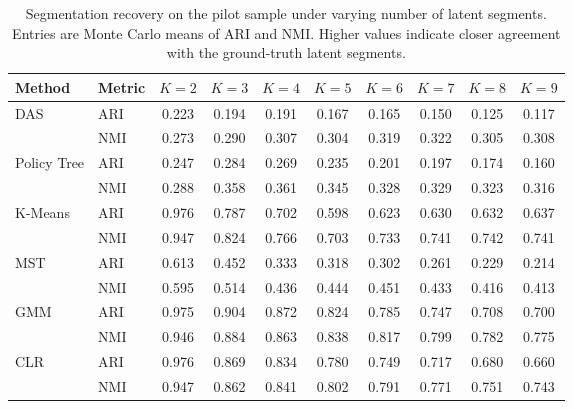 \begin{table}[htbp]
\centering
\caption{Segmentation recovery on the pilot sample under varying number of latent segments. Entries are Monte Carlo means of ARI and NMI. Higher values indicate closer agreement with the ground-truth latent segments.}
\label{tab:app-ari-nmi-varying-K}
\begin{tabular}{llcccccccc}
\toprule
Method & Metric & $K=2$ & $K=3$ & $K=4$ & $K=5$ & $K=6$ & $K=7$ & $K=8$ & $K=9$ \\
\midrule
DAS & ARI & 0.223 & 0.194 & 0.191 & 0.167 & 0.165 & 0.150 & 0.125 & 0.117 \\
 & NMI & 0.273 & 0.290 & 0.307 & 0.304 & 0.319 & 0.322 & 0.305 & 0.308 \\
\addlinespace
Policy Tree & ARI & 0.247 & 0.284 & 0.269 & 0.235 & 0.201 & 0.197 & 0.174 & 0.160 \\
 & NMI & 0.288 & 0.358 & 0.361 & 0.345 & 0.328 & 0.329 & 0.323 & 0.316 \\
\addlinespace
K-Means & ARI & 0.976 & 0.787 & 0.702 & 0.598 & 0.623 & 0.630 & 0.632 & 0.637 \\
 & NMI & 0.947 & 0.824 & 0.766 & 0.703 & 0.733 & 0.741 & 0.742 & 0.741 \\
\addlinespace
MST & ARI & 0.613 & 0.452 & 0.333 & 0.318 & 0.302 & 0.261 & 0.229 & 0.214 \\
 & NMI & 0.595 & 0.514 & 0.436 & 0.444 & 0.451 & 0.433 & 0.416 & 0.413 \\
\addlinespace
GMM & ARI & 0.975 & 0.904 & 0.872 & 0.824 & 0.785 & 0.747 & 0.708 & 0.700 \\
 & NMI & 0.946 & 0.884 & 0.863 & 0.838 & 0.817 & 0.799 & 0.782 & 0.775 \\
\addlinespace
CLR & ARI & 0.976 & 0.869 & 0.834 & 0.780 & 0.749 & 0.717 & 0.680 & 0.660 \\
 & NMI & 0.947 & 0.862 & 0.841 & 0.802 & 0.791 & 0.771 & 0.751 & 0.743 \\
\bottomrule
\end{tabular}
\end{table}

